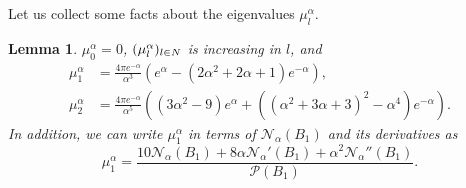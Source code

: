 \documentclass[a4paper,11pt,reqno]{amsart}
\numberwithin{equation}{section}
\newtheorem{lemma}[theorem]{Lemma}
\theoremstyle{remark}
\theoremstyle{definition}
\newcommand{\N}{\mathbb N}
\newcommand{\nl}{\mathcal{N}_{\alpha}}
\newcommand{\Pe}{\mathcal{P}}
\begin{document}
Let us collect some facts about the eigenvalues $\mu_l^{\alpha}$.
	\begin{lemma}\label{lem: Eigenvalue Y Properties} $\mu_0^{\alpha}=0$, $(\mu_l^{\alpha})_{l\in\\N}$ is increasing in $l$, and 
		\begin{align}
			\mu_1^{\alpha} &=\frac{4\pi e^{-\alpha}}{\alpha^3}\left(e^{\alpha}-(2\alpha^2+2\alpha+1)e^{-\alpha}\right),\label{eqn: mu1}\\
			\mu_2^{\alpha} &=\frac{4\pi e^{-\alpha}}{\alpha^5}\left((3\alpha^2-9)e^{\alpha} + \left((\alpha^2+3\alpha+3)^2-\alpha^4\right)e^{-\alpha}\right).\label{eqn: mu2}
		\end{align}
	In addition, we can write $\mu_1^{\alpha}$ in terms of $\nl(B_1)$ and its derivatives as
		\begin{equation}\label{eqn: mu1 rewrite}
			\mu_1^{\alpha} = \frac{10\nl(B_1)+8\alpha\nl'(B_1)+\alpha^2\nl''(B_1)}{\Pe(B_1)}.
		\end{equation}
	\end{lemma}
\end{document}
